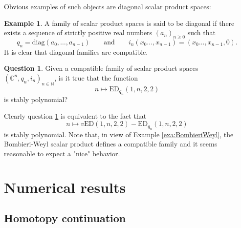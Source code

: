 \documentclass[11pt]{article}
\numberwithin{equation}{section}
\numberwithin{figure}{section}
\theoremstyle{plain}
\theoremstyle{definition}
\newtheorem{example}[thm]{Example}
\newtheorem{quest}[thm]{Question}
\theoremstyle{remark}
\newcommand{\C}{\mathbb{C}}
\newcommand{\ED}{\mathrm{ED}}
\newcommand{\vED}{v\mathrm{ED}}
\begin{document}
Obvious examples of such objects are diagonal scalar product spaces:
\begin{example}
     A family of scalar product spaces is said to be diagonal if there exists a sequence of strictly positive real numbers $\left(  a_n \right)_{n\ge0}$ such that
     \[
     q_n = \mathrm{diag}\left( a_0 ,\dots, a_{n-1}\right) \quad\quad\mathrm{and}\quad\quad i_n \left( x_0\dots,x_{n-1}\right)=\left( x_0\dots,x_{n-1},0\right).
     \]
     It is clear that diagonal families are compatible.
\end{example}

\begin{quest}\label{quest:polynomiality}
    Given a compatible family of scalar product spaces $\left( \C^n, q_n , i_n\right)_{n\in\mathbb N}$, is it true that the function
    \[n\mapsto \ED_{q_n}\left(1,n,2,2\right)\]
    is stably polynomial?
\end{quest}
Clearly question \ref{quest:polynomiality} is equivalent to the fact that
\[n\mapsto \vED\left(1,n,2,2\right) - \ED_{q_n}\left(1,n,2,2\right)\]
is stably polynomial. Note that, in view of Example \ref{exa:BombieriWeyl}, the Bombieri-Weyl scalar product defines a compatible family and it seems reasonable to expect a "nice" behavior.



\section{Numerical results}\label{sec:numerical}
\subsection{Homotopy continuation}\label{sec:Homotopy}
\end{document}
